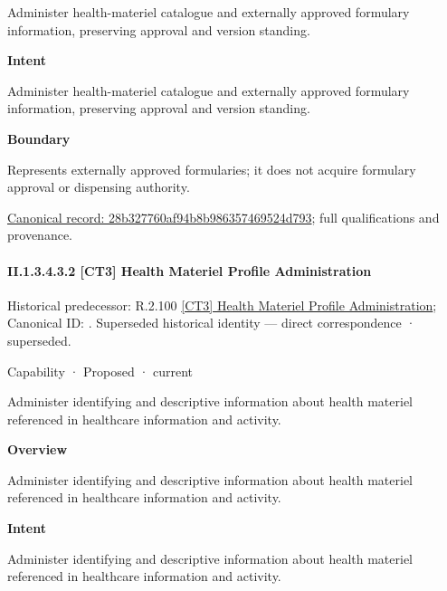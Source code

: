Administer health-materiel catalogue and externally approved formulary information, preserving approval and version standing.



\textbf{Intent}



Administer health-materiel catalogue and externally approved formulary information, preserving approval and version standing.



\textbf{Boundary}



Represents externally approved formularies; it does not acquire formulary approval or dispensing authority.


{\footnotesize \href{../../../../continuum/strategy/capability/28b327760af94b8b986357469524d793.md}{Canonical record: 28b327760af94b8b986357469524d793}; full qualifications and provenance.}\par
\paragraph*{II.1.3.4.3.2 [CT3] Health Materiel Profile Administration}
\label{navigation:II.1.3.4.3.2}

{\small Historical predecessor: R.2.100 \hyperref[element:9216f9cc905e4526b1d98cd4ab382cbf]{[CT3] Health Materiel Profile Administration}; Canonical ID: \texttt{}. Superseded historical identity — direct correspondence · superseded.}\par
\label{element:9626edae517d40d2bfae619860f18e20}
{\small Capability · Proposed · current}\par

Administer identifying and descriptive information about health materiel referenced in healthcare information and activity.



\textbf{Overview}



Administer identifying and descriptive information about health materiel referenced in healthcare information and activity.



\textbf{Intent}



Administer identifying and descriptive information about health materiel referenced in healthcare information and activity.




